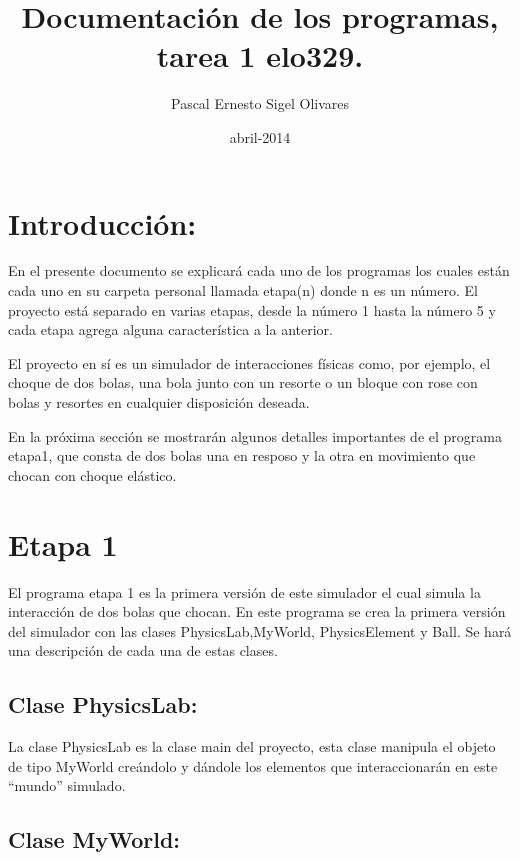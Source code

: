 \documentclass[a4paper,10pt]{article}
\title{Documentación de los programas, tarea 1 elo329.}
\author{Pascal Ernesto Sigel Olivares}
\date{abril-2014}
\begin{document}
\maketitle
\newpage
\section{Introducción:}


En el presente documento se explicará cada uno de los programas los cuales están cada uno en su carpeta personal llamada etapa(n) donde n 
es un número. El proyecto está separado en varias etapas, desde la número 1 hasta la número 5 y cada etapa agrega alguna característica a 
la anterior.\newline

El proyecto en sí es un simulador de interacciones físicas como, por ejemplo, el choque de dos bolas, una bola junto con un resorte 
o un bloque con rose con bolas y resortes en cualquier disposición deseada.\newline

En la próxima sección se mostrarán algunos detalles importantes de el programa etapa1, que consta de dos bolas una en resposo y la otra en 
movimiento que chocan con choque elástico.

\section{Etapa 1}

El programa etapa 1 es la primera versión de este simulador el cual simula la interacción de dos bolas que chocan. 
En este programa se crea la primera versión del simulador con las clases PhysicsLab,MyWorld, PhysicsElement y Ball. Se hará
una descripción de cada una de estas clases.\newline

\subsection{Clase PhysicsLab:}


La clase PhysicsLab es la clase main del proyecto, esta clase manipula el objeto de tipo MyWorld creándolo y dándole los elementos que
interaccionarán en este ``mundo'' simulado.\newline

\subsection{Clase MyWorld:}
\end{document}
